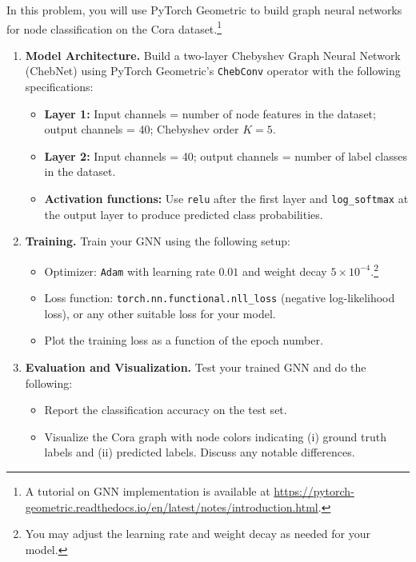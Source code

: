 \documentclass{article}
\begin{document}
In this problem, you will use PyTorch Geometric to build graph neural networks for node classification on the Cora dataset.\footnote{A tutorial on GNN implementation is available at \url{https://pytorch-geometric.readthedocs.io/en/latest/notes/introduction.html}.}

\begin{enumerate}[leftmargin=1.5em]
    \item \textbf{Model Architecture.} Build a two-layer Chebyshev Graph Neural Network (ChebNet) using PyTorch Geometric's \texttt{ChebConv} operator with the following specifications:
    \begin{itemize}[leftmargin=1.5em]
        \item \textbf{Layer 1:} Input channels = number of node features in the dataset; output channels = 40; Chebyshev order $K = 5$.
        \item \textbf{Layer 2:} Input channels = 40; output channels = number of label classes in the dataset.
        \item \textbf{Activation functions:} Use \texttt{relu} after the first layer and \texttt{log\_softmax} at the output layer to produce predicted class probabilities.
    \end{itemize}

    \item \textbf{Training.} Train your GNN using the following setup:
    \begin{itemize}[leftmargin=1.5em]
        \item Optimizer: \texttt{Adam} with learning rate $0.01$ and weight decay $5 \times 10^{-4}$.\footnote{You may adjust the learning rate and weight decay as needed for your model.}
        \item Loss function: \texttt{torch.nn.functional.nll\_loss} (negative log-likelihood loss), or any other suitable loss for your model.
        \item Plot the training loss as a function of the epoch number.
    \end{itemize}

    \item \textbf{Evaluation and Visualization.} Test your trained GNN and do the following:
    \begin{itemize}[leftmargin=1.5em]
        \item Report the classification accuracy on the test set.
        \item Visualize the Cora graph with node colors indicating (i) ground truth labels and (ii) predicted labels. Discuss any notable differences.
    \end{itemize}
\end{enumerate}
\end{document}
